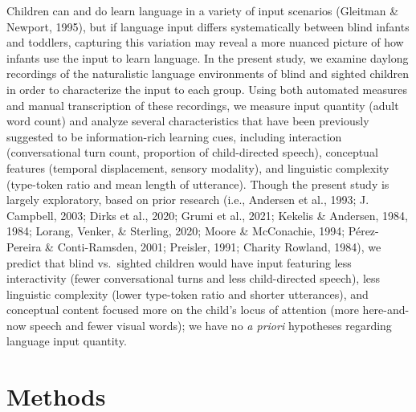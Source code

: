 \documentclass[
  man,floatsintext]{apa6}
\begin{document}
Children can and do learn language in a variety of input scenarios (Gleitman \& Newport, 1995), but if language input differs systematically between blind infants and toddlers, capturing this variation may reveal a more nuanced picture of how infants use the input to learn language. In the present study, we examine daylong recordings of the naturalistic language environments of blind and sighted children in order to characterize the input to each group. Using both automated measures and manual transcription of these recordings, we measure input quantity (adult word count) and analyze several characteristics that have been previously suggested to be information-rich learning cues, including interaction (conversational turn count, proportion of child-directed speech), conceptual features (temporal displacement, sensory modality), and linguistic complexity (type-token ratio and mean length of utterance). Though the present study is largely exploratory, based on prior research (i.e., Andersen et al., 1993; J. Campbell, 2003; Dirks et al., 2020; Grumi et al., 2021; Kekelis \& Andersen, 1984, 1984; Lorang, Venker, \& Sterling, 2020; Moore \& McConachie, 1994; Pérez-Pereira \& Conti-Ramsden, 2001; Preisler, 1991; Charity Rowland, 1984), we predict that blind vs.~sighted children would have input featuring less interactivity (fewer conversational turns and less child-directed speech), less linguistic complexity (lower type-token ratio and shorter utterances), and conceptual content focused more on the child's locus of attention (more here-and-now speech and fewer visual words); we have no \emph{a priori} hypotheses regarding language input quantity.

\hypertarget{methods}{%
\section{Methods}\label{methods}}
\end{document}
